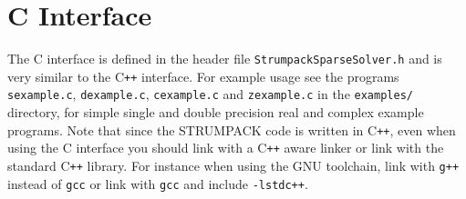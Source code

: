 \documentclass{article}
\begin{document}
\section{C Interface} \label{sec:Cinterface} The C interface is
defined in the header file
\lstinline[style=C]!StrumpackSparseSolver.h! and is very similar to
the C\texttt{++} interface. For example usage see the programs
\lstinline[style=C]!sexample.c!, \lstinline[style=C]!dexample.c!,
\lstinline[style=C]!cexample.c! and \lstinline[style=C]!zexample.c!
in the \lstinline[style=C]!examples/! directory, for simple single and
double precision real and complex example programs. Note that since
the STRUMPACK code is written in C\texttt{++}, even when using the C
interface you should link with a C\texttt{++} aware linker or link
with the standard C\texttt{++} library. For instance when using the
GNU toolchain, link with \texttt{g++} instead of \texttt{gcc} or link
with \texttt{gcc} and include \texttt{-lstdc++}.
\end{document}
